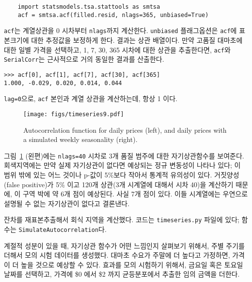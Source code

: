 \begin{verbatim}
    import statsmodels.tsa.stattools as smtsa
    acf = smtsa.acf(filled.resid, nlags=365, unbiased=True)
\end{verbatim}

{\tt acf}는 계열상관을 0 시차부터 {\tt nlags}까지 계산한다.
{\tt unbiased} 플래그옵션은 {\tt acf}에 표본크기에 대한 추정값을 보정하게 한다. 결과는 상관 배열이다. 만약 고품질 대마초에 대한 일별 가격을 선택하고, 1, 7, 30, 365 시차에 대한 상관을 추출한다면, 
{\tt acf}와 {\tt SerialCorr}는 근사적으로 거의 동일한 결과를 산출한다.

\begin{verbatim}
>>> acf[0], acf[1], acf[7], acf[30], acf[365]
1.000, -0.029, 0.020, 0.014, 0.044
\end{verbatim}

{\tt lag=0}으로, {\tt acf} 본인과 계열 상관을 계산하는데, 항상 1 이다.

\begin{figure}
\centerline{\texttt{[image: figs/timeseries9.pdf]}}
\caption{Autocorrelation function for daily prices (left), and
daily prices with a simulated weekly seasonality (right).}
\label{timeseries9}
\end{figure}

그림~\ref{timeseries9} (왼편)에는 {\tt nlags=40} 시차로 3개 품질 범주에 대한 자기상관함수를 보여준다.
회색지역에는 만약 실제 자기상관이 없다면 예상되는 정규 변동성이 나타나 있다; 이 범위 밖에 있는 어느 것이나 p-값이 5\%보다 작아서 통계적 유의성이 있다. 거짓양성(false positive)가 5\% 이고 120개 상관(3개 시계열에 대해서 시차 40)을 계산하기 때문에, 이 구역 박에 약 6개 점이 예상된다.
사실 7개 점이 있다. 이들 시계열에는 우연으로 설명될 수 없는 자기상관이 없다고 결론낸다.

잔차를 재표본추출해서 회식 지역을 계산했다. 코드는 {\tt timeseries.py} 파일에 있다; 함수는 {\tt SimulateAutocorrelation}다.

계절적 성분이 있을 때, 자기상관 함수가 어떤 느낌인지 살펴보기 위해서, 주별 주기를 더해서 모의 시험 데이터를 생성했다. 대마초 수요가 주말에 더 높다고 가정하면, 가격이 더 높을 것으로 예상할 수 있다. 효과를 모의 시험하기 위해서, 금요일 혹은 토요일 날짜를 선택하고, 가격에 \$0 에서 \$2 까지 균등분포에서 추출한 임의 금액을 더한다.

